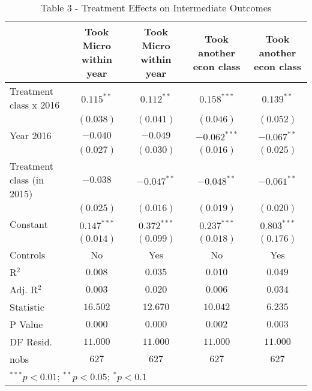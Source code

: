 
\begin{table}
\caption{Table 3 - Treatment Effects on Intermediate Outcomes}
\begin{center}
\begin{tabular}{l c c c c}
\hline
 & Took Micro within year & Took Micro within year & Took another econ class & Took another econ class \\
\hline
Treatment class x 2016    & $0.115^{**}$  & $0.112^{**}$  & $0.158^{***}$  & $0.139^{**}$  \\
                          & $(0.038)$     & $(0.041)$     & $(0.046)$      & $(0.052)$     \\
Year 2016                 & $-0.040$      & $-0.049$      & $-0.062^{***}$ & $-0.067^{**}$ \\
                          & $(0.027)$     & $(0.030)$     & $(0.016)$      & $(0.025)$     \\
Treatment class (in 2015) & $-0.038$      & $-0.047^{**}$ & $-0.048^{**}$  & $-0.061^{**}$ \\
                          & $(0.025)$     & $(0.016)$     & $(0.019)$      & $(0.020)$     \\
Constant                  & $0.147^{***}$ & $0.372^{***}$ & $0.237^{***}$  & $0.803^{***}$ \\
                          & $(0.014)$     & $(0.099)$     & $(0.018)$      & $(0.176)$     \\
\hline
Controls                  & No            & Yes           & No             & Yes           \\
R$^2$                     & $0.008$       & $0.035$       & $0.010$        & $0.049$       \\
Adj. R$^2$                & $0.003$       & $0.020$       & $0.006$        & $0.034$       \\
Statistic                 & $16.502$      & $12.670$      & $10.042$       & $6.235$       \\
P Value                   & $0.000$       & $0.000$       & $0.002$        & $0.003$       \\
DF Resid.                 & $11.000$      & $11.000$      & $11.000$       & $11.000$      \\
nobs                      & $627$         & $627$         & $627$          & $627$         \\
\hline
\multicolumn{5}{l}{\scriptsize{$^{***}p<0.01$; $^{**}p<0.05$; $^{*}p<0.1$}}
\end{tabular}
\label{table:coefficients}
\end{center}
\end{table}
